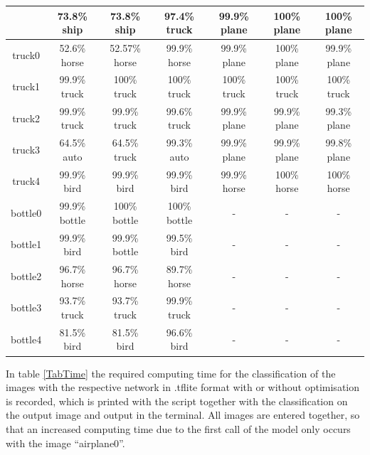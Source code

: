 \begin{longtable}{| c | c | c | c | c | c | c |}
& 73.8\% ship\cellcolor{green}		
& 73.8\% ship\cellcolor{green} 	
& 97.4\% truck 	
&  99.9\% plane
& 100\% plane 
& 100\% plane\\
 \hline
truck0 \cellcolor{light-gray}	
& 52.6\% horse		
& 52.57\% horse	
& 99.9\% horse 	
&  99.9\% plane& 100\% plane
& 99.9\% plane\\
 \hline
truck1 \cellcolor{light-gray}	
& 99.9\% truck\cellcolor{green}		
& 100\% truck \cellcolor{green}	
& 100\% truck\cellcolor{green} 	
&  100\% truck\cellcolor{green}	
 & 100\% truck\cellcolor{green} 	
 & 100\% truck\cellcolor{green}\\
 \hline
truck2 \cellcolor{light-gray}	
& 99.9\% truck\cellcolor{green}		
& 99.9\% truck\cellcolor{green} 	
& 99.6\% truck\cellcolor{green} 	
&  99.9\% plane
& 99.9\% plane 	
& 99.3\% plane\\
 \hline
truck3 \cellcolor{light-gray}	
& 64.5\% auto		
& 64.5\% truck\cellcolor{green} 	
& 99.3\% auto 	
&  99.9\% plane
& 99.9\% plane 	
& 99.8\% plane\\
 \hline
truck4 \cellcolor{light-gray}	
& 99.9\% bird		
& 99.9\% bird 	
& 99.9\% bird 	
&  99.9\% horse	 
& 100\% horse 	
& 100\% horse\\
 \hline
bottle0\cellcolor{light-gray} 	
& 99.9\% bottle\cellcolor{green}		
& 100\% bottle\cellcolor{green} 	
& 100\% bottle\cellcolor{green} 	&  -	 & - 	& -\\
 \hline
bottle1\cellcolor{light-gray} 	
& 99.9\% bird		
& 99.9\% bottle\cellcolor{green} 	
& 99.5\% bird 	&  -	 & - 	& -\\
 \hline
bottle2\cellcolor{light-gray} 	
& 96.7\% horse		
& 96.7\% horse 	
& 89.7\% horse 	&  -	 & - 	& -\\
 \hline
bottle3\cellcolor{light-gray} 	
& 93.7\% truck		
& 93.7\% truck 	
& 99.9\% truck 	&  -	 & - 	& -\\
 \hline
bottle4\cellcolor{light-gray} 	
& 81.5\% bird		
& 81.5\% bird 	
& 96.6\% bird 	&  -	 & - 	& -\\
 \hline
\end{longtable}

In table \ref{TabTime} the required computing time for the classification of the images with the respective network in .tflite format with or without optimisation is recorded, which is printed with the script  together with the classification on the output image and output in the terminal. All images are entered together, so that an increased computing time due to the first call of the model only occurs with the image ``airplane0''.

